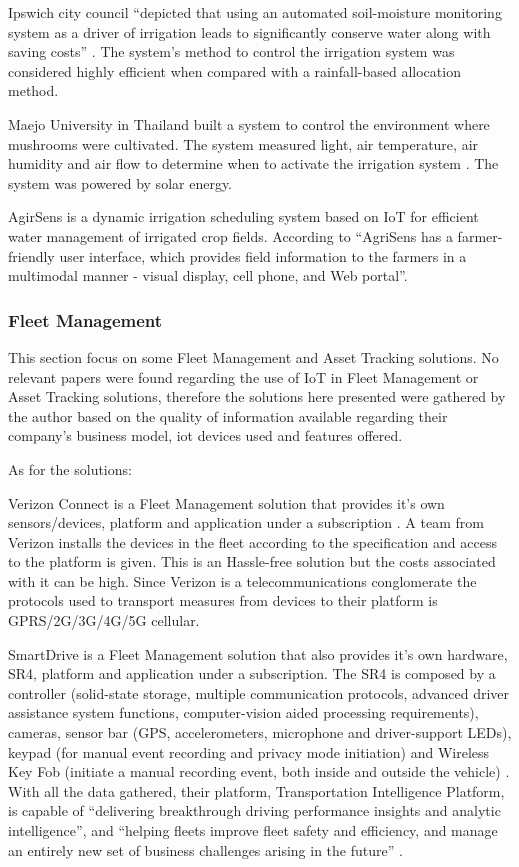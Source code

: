 Ipswich city council ``depicted that using an automated soil-moisture monitoring system as a driver of irrigation leads to significantly conserve water along with saving costs'' \parencite{OBAIDEEN2022100124}. The system's method to control the irrigation system was considered highly efficient when compared with a rainfall-based allocation method.

Maejo University in Thailand built a system to control the environment where mushrooms were cultivated. The system measured light, air temperature, air humidity and air flow to determine when to activate the irrigation system \parencite{OBAIDEEN2022100124}. The system was powered by solar energy.

AgirSens is a dynamic irrigation scheduling system based on IoT for efficient water management of irrigated crop fields. According to \cite{9249427} ``AgriSens has a farmer-friendly user interface, which provides field information to the farmers in a multimodal manner - visual display, cell phone, and Web portal''.

\subsubsection{Fleet Management}
\label{subsubsec:stateofart:arch:solutions:fleet}

This section focus on some Fleet Management and Asset Tracking solutions. No relevant papers were found regarding the use of \gls{IoT} in Fleet Management or Asset Tracking solutions, therefore the solutions here presented were gathered by the author based on the quality of information available regarding their company's business model, iot devices used and features offered.

As for the solutions:

Verizon Connect is a Fleet Management solution that provides it's own sensors/devices, platform and application under a subscription \parencite{verizon-iot}.
A team from Verizon installs the devices in the fleet according to the specification and access to the platform is given. This is an Hassle-free solution but the costs associated with it can be high. Since Verizon is a telecommunications conglomerate the protocols used to transport measures from devices to their platform is GPRS/2G/3G/4G/5G cellular.

SmartDrive is a Fleet Management solution that also provides it's own hardware, SR4, platform and application under a subscription. The SR4 is composed by a controller (solid-state storage, multiple communication protocols, advanced driver assistance system functions, computer-vision aided processing requirements), cameras, sensor bar (GPS, accelerometers, microphone and driver-support LEDs), keypad (for manual event recording and privacy mode initiation) and Wireless Key Fob (initiate a manual recording event, both inside and outside the vehicle) \parencite{smartdrive-iot}. With all the data gathered, their platform, Transportation Intelligence Platform, is capable of ``delivering breakthrough driving performance insights and analytic intelligence'', and ``helping fleets improve fleet safety and efficiency, and manage an entirely new set of business challenges arising in the future'' \parencite{smartdrive-iot2}.

